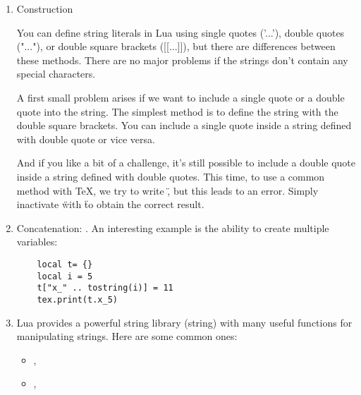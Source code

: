 \begin{enumerate}[label=(\alph*)]
  \item Construction

 You can define string literals in Lua using single quotes ('...'), double quotes ("..."), or double square brackets ([[...]]), but there are differences between these methods. There are no major problems if the strings don't contain any special characters.


A first small problem arises if we want to include a single quote or a double quote into the string. The simplest method is to define the string with the double square brackets. You can include a single quote inside a string defined with double quote or vice versa.

\begin{tkzexample}[latex=.4\textwidth]
\end{tkzexample}

And if you like a bit of a challenge, it's still possible to include a double quote inside a string defined with double quotes. This time, to use a common method with \TeX{}, we try to write \", but this leads to an error. Simply inactivate \" with \string\" to obtain the correct result.

\begin{tkzexample}[latex=.4\textwidth]
\end{tkzexample}



\item Concatenation: . An interesting example is the ability to create multiple variables:
\begin{mybox}
  \begin{verbatim}
    local t= {}
    local i = 5
    t["x_" .. tostring(i)] = 11
    tex.print(t.x_5)
  \end{verbatim}

\end{mybox}


\item Lua provides a powerful string library (string) with many useful functions for manipulating strings. Here are some common ones:

\begin{itemize}

\item {},
\item {},


\end{itemize}
\end{enumerate}
